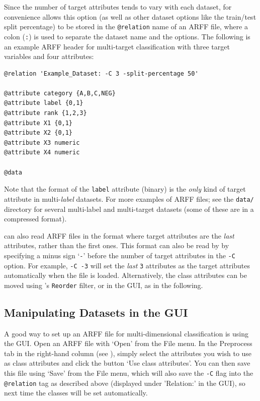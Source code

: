 \documentclass[11pt]{article}
\newcommand{\MEKA}{Meka}
\newcommand{\WEKA}{Weka}
\newcommand{\MULAN}{Mulan}
\begin{document}
Since the number of target attributes tends to vary with each dataset, for convenience \framework{\MEKA} allows this option (as well as other dataset options like the train/test split percentage) to be stored in the \texttt{@relation} name of an ARFF file, where a colon (\texttt{:}) is used to separate the dataset name and the options. The following is an example ARFF header for multi-target classification with three target variables and four attributes:

{\small
\begin{verbatim}
@relation 'Example_Dataset: -C 3 -split-percentage 50'

@attribute category {A,B,C,NEG}
@attribute label {0,1}
@attribute rank {1,2,3}
@attribute X1 {0,1}
@attribute X2 {0,1}
@attribute X3 numeric
@attribute X4 numeric

@data
\end{verbatim}
}

Note that the format of the \texttt{label} attribute (binary) is the \emph{only} kind of target attribute in multi-\emph{label} datasets. For more examples of \framework{\MEKA} ARFF files; see the \texttt{data/} directory for several multi-label and multi-target datasets (some of these are in a compressed format).

\framework{\MEKA} can also read ARFF files in the \framework{\MULAN} format where target attributes are the \emph{last} attributes, rather than the first ones. This format can also be read by \framework{\MEKA} by specifying a minus sign `\texttt{-}' before the number of target attributes in the \texttt{-C} option. For example, \texttt{-C -3} will set the \emph{last} \texttt{3} attributes as the target attributes automatically when the file is loaded. Alternatively, the class attributes can be moved using \framework{\WEKA}'s \texttt{Reorder} filter, or in the GUI, as in the following. %


\subsection{Manipulating Datasets in the GUI}
\label{sec:data.gui}

A good way to set up an ARFF file for multi-dimensional classification is using the GUI. Open an ARFF file with `\textsf{Open}' from the \textsf{File} menu. In the \textsf{Preprocess} tab in the right-hand column (see ), simply select the attributes you wish to use as class attributes and click the button `\textsf{Use class attributes}'. You can then save this file using `\textsf{Save}' from the \textsf{File} menu, which will also save the \texttt{-C} flag into the \texttt{@relation} tag as described above (displayed under '\textsf{Relation:}' in the GUI), so next time the classes will be set automatically.
\end{document}
